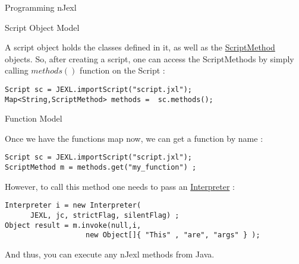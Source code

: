 \begin{section}{Programming nJexl}

\begin{subsection}{Script Object Model}


A script object holds the classes defined in it, 
as well as the \href{https://github.com/nmondal/njexl/blob/master/lang/src/main/java/com/noga/njexl/lang/extension/oop/ScriptMethod.java}{ScriptMethod} objects. So, after creating a script, one can access the ScriptMethods by simply calling $methods()$
function on the Script :

\begin{lstlisting}[style=myJavaStyle]
Script sc = JEXL.importScript("script.jxl");
Map<String,ScriptMethod> methods =  sc.methods();
\end{lstlisting} 

\end{subsection}

\begin{subsection}{Function Model}

Once we have the functions map now, we can get a function by name :

\begin{lstlisting}[style=myJavaStyle]
Script sc = JEXL.importScript("script.jxl");
ScriptMethod m = methods.get("my_function") ;
\end{lstlisting} 

However, to call this method one needs to pass an 
\href{https://github.com/nmondal/njexl/blob/master/lang/src/main/java/com/noga/njexl/lang/Interpreter.java}{Interpreter} :

\begin{lstlisting}[style=myJavaStyle]
Interpreter i = new Interpreter(
      JEXL, jc, strictFlag, silentFlag) ;
Object result = m.invoke(null,i,
                   new Object[]{ "This" , "are", "args" } );
\end{lstlisting} 

And thus, you can execute any nJexl methods from Java.
\end{subsection}

\end{section}

